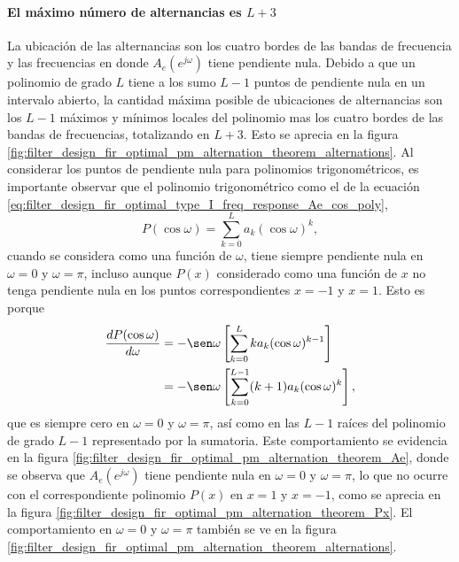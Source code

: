 \documentclass[a4paper]{report}
\begin{document}
\paragraph{El máximo número de alternancias es \(L+3\)} La ubicación de las alternancias son los cuatro bordes de las bandas de frecuencia y las frecuencias en donde \(A_e(e^{j\omega})\) tiene pendiente nula. Debido a que un polinomio de grado \(L\) tiene a los sumo \(L-1\) puntos de pendiente nula en un intervalo abierto, la cantidad máxima posible de ubicaciones de alternancias son los \(L-1\) máximos y mínimos locales del polinomio mas los cuatro bordes de las bandas de frecuencias, totalizando en \(L+3\). Esto se aprecia en la figura \ref{fig:filter_design_fir_optimal_pm_alternation_theorem_alternations}. Al considerar los puntos de pendiente nula para polinomios trigonométricos, es importante observar que el polinomio trigonométrico como el de la ecuación \ref{eq:filter_design_fir_optimal_type_I_freq_response_Ae_cos_poly}, 
\[
 P(\cos\omega)=\sum_{k=0}^L a_k(\cos\omega)^k,
\]
cuando se considera como una función de \(\omega\), tiene siempre pendiente nula en \(\omega=0\) y \(\omega=\pi\), incluso aunque \(P(x)\) considerado como una función de \(x\) no tenga pendiente nula en los puntos correspondientes \(x=-1\) y \(x=1\). Esto es porque 
\begin{align*}
 \frac{dP(\cos\omega)}{d\omega}&=-\sen\omega\left[\sum_{k=0}^Lka_k(\cos\omega)^{k-1}\right]\\
   &=-\sen\omega\left[\sum_{k=0}^{L-1}(k+1)a_k(\cos\omega)^{k}\right],
\end{align*}
que es siempre cero en \(\omega=0\) y \(\omega=\pi\), así como en las \(L-1\) raíces del polinomio de grado \(L-1\) representado por la sumatoria. Este comportamiento se evidencia en la figura \ref{fig:filter_design_fir_optimal_pm_alternation_theorem_Ae}, donde se observa que \(A_e(e^{j\omega})\) tiene pendiente nula en \(\omega=0\) y \(\omega=\pi\), lo que no ocurre con el correspondiente polinomio \(P(x)\) en \(x=1\) y \(x=-1\), como se aprecia en la figura \ref{fig:filter_design_fir_optimal_pm_alternation_theorem_Px}. El comportamiento en \(\omega=0\) y \(\omega=\pi\) también se ve en la figura \ref{fig:filter_design_fir_optimal_pm_alternation_theorem_alternations}.
\end{document}
